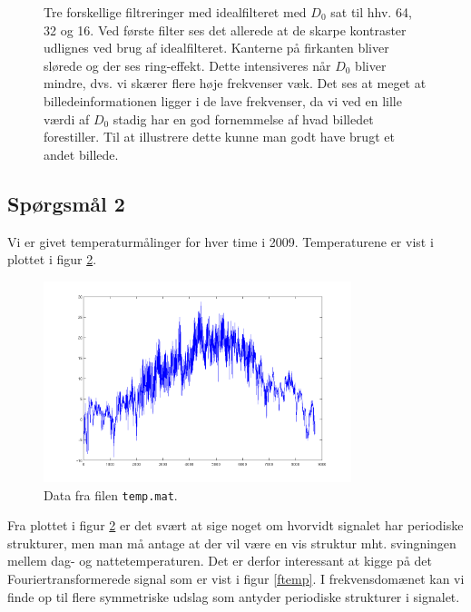 \documentclass[a4paper, 10pt, danish, final]{article}
\begin{document}
\begin{figure}[!h]
    \caption[]{Tre forskellige filtreringer med idealfilteret med
    $D_0$ sat til hhv. 64, 32 og 16. Ved første filter ses det allerede
    at de skarpe kontraster udlignes ved brug af idealfilteret. Kanterne
    på firkanten bliver slørede og der ses ring-effekt. Dette
    intensiveres når $D_0$ bliver mindre, dvs. vi skærer flere høje
    frekvenser væk. Det ses at meget at billedeinformationen ligger i de
    lave frekvenser, da vi ved en lille værdi af $D_0$ stadig har en god
    fornemmelse af hvad billedet forestiller. Til at illustrere dette
    kunne man godt have brugt et andet billede.}
    \label{ideal_filter}
\end{figure}
\clearpage

\subsection*{Spørgsmål 2}
Vi er givet temperaturmålinger for hver time i 2009. Temperaturene er
vist i plottet i figur \ref{temp}.

\begin{figure}[!h]
    \centering
    \includegraphics[angle=0,width=0.80\textwidth]{images/temp}
    \caption[]{Data fra filen \texttt{temp.mat}.}
    \label{temp}
\end{figure}

Fra plottet i figur \ref{temp} er det svært at sige noget om hvorvidt
signalet har periodiske strukturer, men man må antage at der vil være en
vis struktur mht. svingningen mellem dag- og nattetemperaturen. Det er
derfor interessant at kigge på det Fouriertransformerede signal som er
vist i figur \ref{ftemp}. I frekvensdomænet kan vi finde op til flere
symmetriske udslag som antyder periodiske strukturer i signalet.
\end{document}
